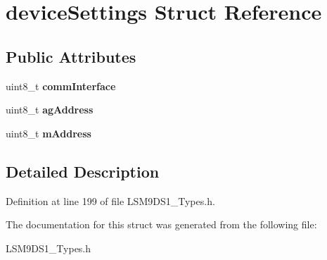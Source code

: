\hypertarget{structdeviceSettings}{}\section{device\+Settings Struct Reference}
\label{structdeviceSettings}
\subsection*{Public Attributes}
\begin{DoxyCompactItemize}
\item 
\mbox{\label{structdeviceSettings_a6512c63d06cce5f99760b1b3a6a4dfe9}} 
uint8\+\_\+t {\bfseries comm\+Interface}
\item 
\mbox{\label{structdeviceSettings_a2f43ac785e01fcbcfaf8436885f638ab}} 
uint8\+\_\+t {\bfseries ag\+Address}
\item 
\mbox{\label{structdeviceSettings_aec4e1d3e3f38b4e3e0f74f1640e16faa}} 
uint8\+\_\+t {\bfseries m\+Address}
\end{DoxyCompactItemize}


\subsection{Detailed Description}


Definition at line 199 of file L\+S\+M9\+D\+S1\+\_\+\+Types.\+h.



The documentation for this struct was generated from the following file\+:\begin{DoxyCompactItemize}
\item 
L\+S\+M9\+D\+S1\+\_\+\+Types.\+h\end{DoxyCompactItemize}
